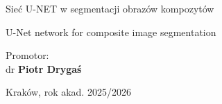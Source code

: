 \begin{titlepage}
\begin{center}
Sieć U-NET w segmentacji obrazów kompozytów \\
\vspace{0.3cm}

U-Net network for composite image segmentation

\end{center}

\vspace{2cm}


\begin{center}
\large Promotor: \\ dr \textbf{Piotr Drygaś}
\end{center}

\vspace{1cm}

\begin{center}
\Large Kraków, rok akad. 2025/2026
\end{center}
\end{titlepage}

\shipout\null

